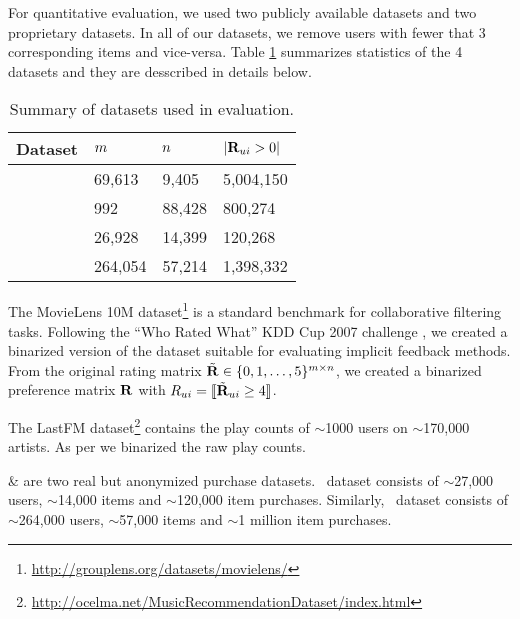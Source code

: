 For quantitative evaluation, we used two publicly available datasets and two proprietary datasets. In all of our datasets, we remove users with fewer
that 3 corresponding items and vice-versa. Table \ref{tbl:datasets} summarizes statistics of the 4 datasets and they are desscribed in details below.

\begin{table}
	\centering
	\caption{Summary of datasets used in evaluation.}
	\label{tbl:datasets}
	
	\begin{tabular}{llll}
	\toprule
	\toprule	
	\textbf{Dataset} & $m$ & $n$ & $ | \mathbf{R}_{ui} > 0 | $ \\
	\toprule
	\MLens  & 69,613 & 9,405 & 5,004,150 \\
	\LastFM & 992 & 88,428 & 800,274\\
	\Guitar & 26,928 & 14,399 & 120,268 \\
	\Lowes & 264,054 & 57,214 & 1,398,332 \\
	\bottomrule
	\end{tabular}
\end{table}

\MLens The MovieLens 10M dataset\footnote{\scriptsize \url{http://grouplens.org/datasets/movielens/}} is a standard benchmark for collaborative filtering tasks.
Following the ``Who Rated What'' KDD Cup 2007 challenge \citep{Bennett:2007}, we created a binarized version of the dataset suitable for evaluating implicit feedback methods.
From the original rating matrix $\tilde{\mathbf{R}} \in \{ 0, 1, \ldots, 5 \}^{m \times n}$, we created a binarized preference matrix $\mathbf{R}$ with $R_{ui} = \llbracket \tilde{\mathbf{R}}_{ui} \geq 4 \rrbracket$.

\LastFM The LastFM dataset\footnote{{\scriptsize \url{http://ocelma.net/MusicRecommendationDataset/index.html}}} \citep{Celma:2008} contains the play counts of $\sim$1000 users on $\sim$170,000 artists. As per \MLens we binarized the raw play counts.


\Guitar \& \Lowes  are two real but anonymized purchase datasets. 
\Guitar \ dataset consists of $\sim$27,000 users, $\sim$14,000 items and $\sim$120,000 item purchases. Similarly, \Lowes \ dataset consists of $\sim$264,000 users, $\sim$57,000 items and $\sim$1 million item purchases. 


